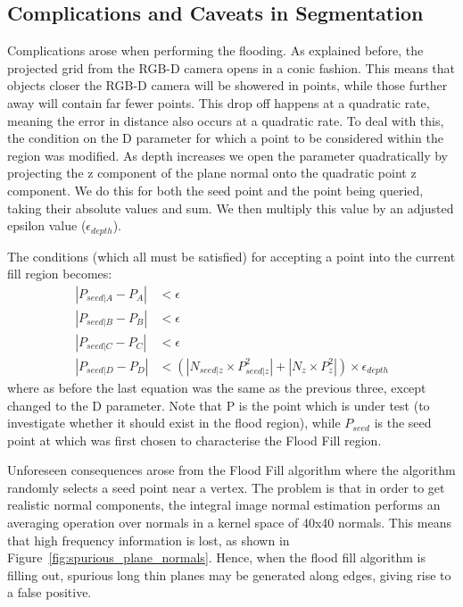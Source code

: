 \documentclass[]{article}
\begin{document}
{\subsection{Complications and Caveats in Segmentation} %
\label{sub:complications_in_the_segmentation_algorithm}


Complications arose when performing the flooding. As explained before, the projected grid from the RGB-D camera opens in a conic fashion. This means that objects closer the RGB-D camera will be showered in points, while those further away will contain far fewer points. This drop off happens at a quadratic rate, meaning the error in distance also occurs at a quadratic rate. To deal with this, the condition on the D parameter for which a point to be considered within the region was modified. As depth increases we open the parameter quadratically by projecting the z component of the plane normal onto the quadratic point z component. We do this for both the seed point and the point being queried, taking their absolute values and sum. We then multiply this value by an adjusted epsilon value ($\epsilon_{depth}$). 


The conditions (which all must be satisfied) for accepting a point into the current fill region becomes:
\begin{align}
|P_{seed|A} - P_{A}| &< \epsilon \\
|P_{seed|B} - P_{B}| &< \epsilon\\
|P_{seed|C} - P_{C}| &< \epsilon\\
|P_{seed|D}-P_{D}| &< (|N_{seed|z} \times P^{2}_{seed|z}| + |N_{z} \times P^{2}_{z}|) \times \epsilon_{depth}
\end{align}
where as before the last equation was the same as the previous three, except changed to the D parameter.
Note that P is the point which is under test (to investigate whether it should exist in the flood region), while $P_{seed}$ is the seed point at which was first chosen to characterise the Flood Fill region. 

Unforeseen consequences arose from the Flood Fill algorithm where the algorithm randomly selects a seed point near a vertex. The problem is that in order to get realistic normal components, the integral image normal estimation performs an averaging operation over normals in a kernel space of 40x40 normals. This means that high frequency information is lost, as shown in Figure~\ref{fig:spurious_plane_normals}. Hence, when the flood fill algorithm is filling out, spurious long thin planes may be generated along edges, giving rise to a false positive. 

}
\end{document}
